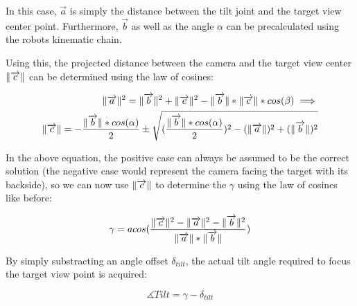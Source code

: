 \documentclass{article}
\DeclarePairedDelimiter\norm{\lVert}{\rVert}%
\begin{document}
In this case, $\overrightarrow{a}$ is simply the distance between the tilt joint and the target view center point. Furthermore, $\overrightarrow{b}$ as well as the angle $\alpha$ can be precalculated using the robots kinematic chain.

Using this, the projected distance between the camera and the target view center $\norm{\overrightarrow{c}}$ can be determined using the law of cosines:

\begin{equation}
\begin{aligned}
\norm{\overrightarrow{a}}^2 = \norm{\overrightarrow{b}}^2 + \norm{\overrightarrow{c}}^2 - \norm{\overrightarrow{b}}*\norm{\overrightarrow{c}}*cos(\beta) 
\implies \\
\norm{\overrightarrow{c}} = -\frac{\norm{\overrightarrow{b}}*cos(\alpha)}{2} \pm \sqrt{(\frac{\norm{\overrightarrow{b}}*cos(\alpha)}{2})^2-(\norm{\overrightarrow{a}})^2+(\norm{\overrightarrow{b}})^2}
\end{aligned}
\end{equation}

In the above equation, the positive case can always be assumed to be the correct solution (the negative case would represent the camera facing the target with its backside), so we can now use $\norm{\overrightarrow{c}}$ to determine the $\gamma$ using the law of cosines like before:

\begin{equation}
\gamma = acos(\frac{\norm{\overrightarrow{c}}^2 - \norm{\overrightarrow{a}}^2 - \norm{\overrightarrow{b}}^2}{\norm{\overrightarrow{a}}*\norm{\overrightarrow{b}}})
\end{equation}

By simply substracting an angle offset $\delta_{tilt}$, the actual tilt angle required to focus the target view point is acquired:

\begin{equation}
\measuredangle{}Tilt = \gamma-\delta_{tilt}
\end{equation}
\printbibliography
\end{document}
